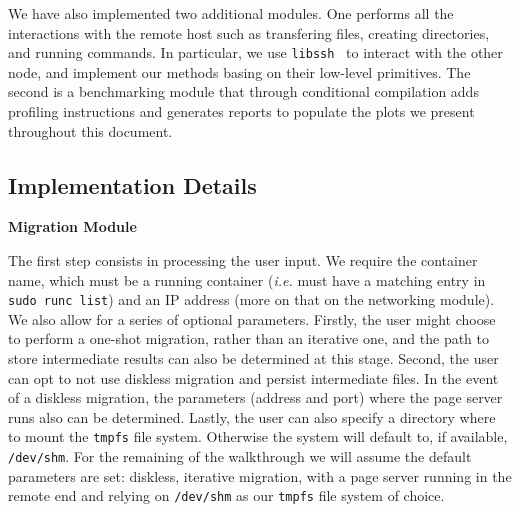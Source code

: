 We have also implemented two additional modules.
One performs all the interactions with the remote host such as transfering files, creating directories, and running \criu commands.
In particular, we use \texttt{libssh}~\cite{libssh} to interact with the other node, and implement our methods basing on their low-level primitives.
The second is a benchmarking module that through conditional compilation adds profiling instructions and generates reports to populate the plots we present throughout this document.

\subsection{Implementation Details}

\textbf{Migration Module}

The first step consists in processing the user input.
We require the container name, which must be a running container (\textit{i.e.} must have a matching entry in \texttt{sudo runc list}) and an IP address (more on that on the networking module).
We also allow for a series of optional parameters.
Firstly, the user might choose to perform a one-shot migration, rather than an iterative one, and the path to store intermediate results can also be determined at this stage.
Second, the user can opt to not use diskless migration and persist intermediate files.
In the event of a diskless migration, the parameters (address and port) where the page server runs also can be determined.
Lastly, the user can also specify a directory where to mount the \texttt{tmpfs} file system.
Otherwise the system will default to, if available, \texttt{/dev/shm}.
For the remaining of the walkthrough we will assume the default parameters are set: diskless, iterative migration, with a page server running in the remote end and relying on \texttt{/dev/shm} as our \texttt{tmpfs} file system of choice.

